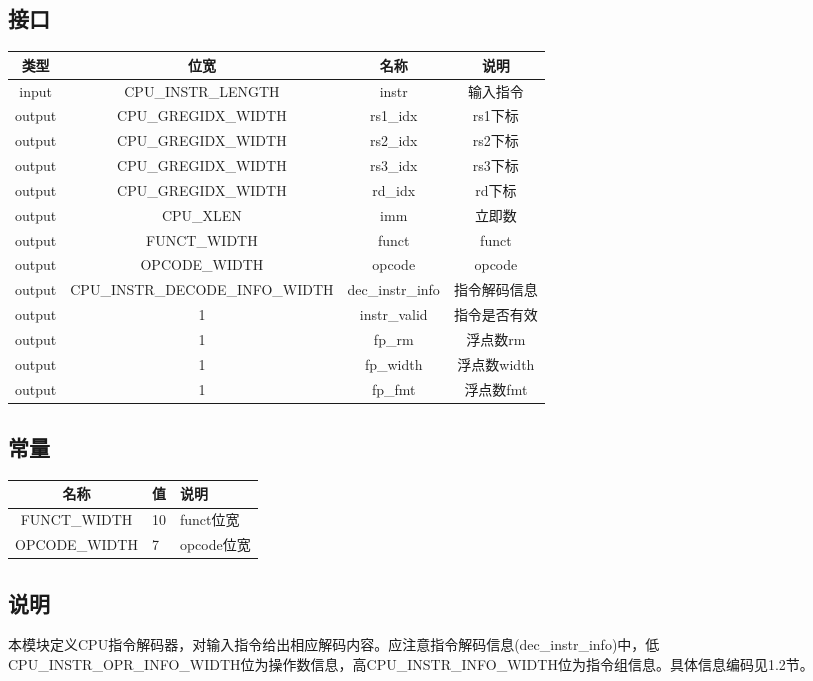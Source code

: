 \subsection{接口}
\begin{tabular}{|c|c|c|c|}
    \hline
    类型    &   位宽    &   名称    &   说明\\\hline
    input   &   CPU\_INSTR\_LENGTH   &   instr &   输入指令\\\hline
    output   &   CPU\_GREGIDX\_WIDTH &   rs1\_idx    &   rs1下标\\\hline
    output   &   CPU\_GREGIDX\_WIDTH &   rs2\_idx    &   rs2下标\\\hline
    output   &   CPU\_GREGIDX\_WIDTH &   rs3\_idx    &   rs3下标\\\hline
    output   &   CPU\_GREGIDX\_WIDTH &   rd\_idx    &   rd下标\\\hline
    output   &   CPU\_XLEN &   imm    &   立即数\\\hline
    output   &   FUNCT\_WIDTH &   funct    &   funct\\\hline
    output   &   OPCODE\_WIDTH &   opcode    &   opcode\\\hline
    output   &   CPU\_INSTR\_DECODE\_INFO\_WIDTH &   dec\_instr\_info    &   指令解码信息\\\hline
    output   &   1 &   instr\_valid    &   指令是否有效\\\hline
    output   &   1 &   fp\_rm    &   浮点数rm\\\hline
    output   &   1 &   fp\_width    &   浮点数width\\\hline
    output   &   1 &   fp\_fmt    &   浮点数fmt\\\hline
\end{tabular}
\subsection{常量}
\begin{tabular}{|c|p{3cm}|p{6cm}|}
    \hline
    名称    &   值  &   说明\\\hline
    FUNCT\_WIDTH & 10 & funct位宽\\\hline
    OPCODE\_WIDTH & 7 & opcode位宽\\\hline
\end{tabular}
\subsection{说明}
本模块定义CPU指令解码器，对输入指令给出相应解码内容。应注意指令解码信息(dec\_instr\_info)中，低CPU\_INSTR\_OPR\_INFO\_WIDTH位为操作数信息，高CPU\_INSTR\_INFO\_WIDTH位为指令组信息。具体信息编码见1.2节。

